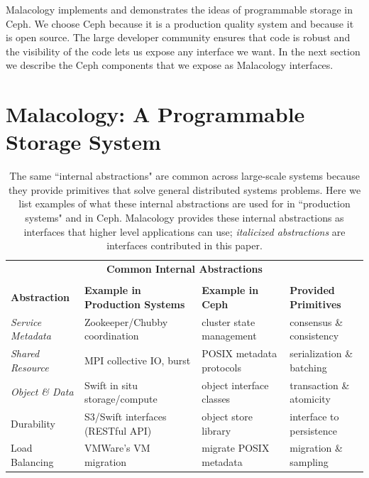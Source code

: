 \documentclass[preprint]{sigplanconf-eurosys}
\begin{document}
Malacology implements and demonstrates the ideas of programmable storage in
Ceph. We choose Ceph because it is a production quality system and because it
is open source. The large developer community ensures that code is
robust and the visibility of the code lets us expose any interface we want. In
the next section we describe the Ceph components that we expose as Malacology
interfaces.

\section{Malacology: A Programmable Storage System}
\label{sec:malacology}

\begin{table}
\centering
\begin{tabular}{  l | l | l | l }
\multicolumn{4}{c}{\Large \textbf{Common Internal Abstractions}} \\
\multicolumn{4}{c}{} \\
\textbf{Abstraction}                    &
\textbf{Example in Production Systems}  &
\textbf{Example in Ceph}                &
\textbf{Provided Primitives}            \\ \hline
{\it Service Metadata}
  & Zookeeper/Chubby coordination~\cite{hunt_zookeeper_2010,website:chubby}
  & cluster state management~\cite{website:ceph-mon}
  & consensus \& consistency
  \\
{\it Shared Resource}
  & MPI collective IO, burst
  & POSIX metadata protocols
  & serialization \& batching
  \\
{\it Object \& Data}
  & Swift in situ storage/compute~\cite{website:zerocloud}
  & object interface classes~\cite{website:cls-lua}
  & transaction \& atomicity
  \\
Durability
  & S3/Swift interfaces (RESTful API)
  & object store library~\cite{weil_rados_2007}
  & interface to persistence
  \\
Load Balancing
  & VMWare's VM migration~\cite{vmware-drs,gulati:hotcloud2011-cloud-resource-management} 
  & migrate POSIX metadata~\cite{weil:sc2004-dyn-metadata}
  & migration \& sampling
  \\
\end{tabular}
\caption{The same ``internal abstractions" are common across large-scale
systems because they provide primitives that solve general distributed systems
problems.  Here we list examples of what these internal abstractions are used
for in ``production systems" and in Ceph.  Malacology provides these internal
abstractions as interfaces that higher level applications can use; {\it
italicized abstractions} are interfaces contributed in this paper.}
\label{table:examples}
\end{table}
\end{document}
